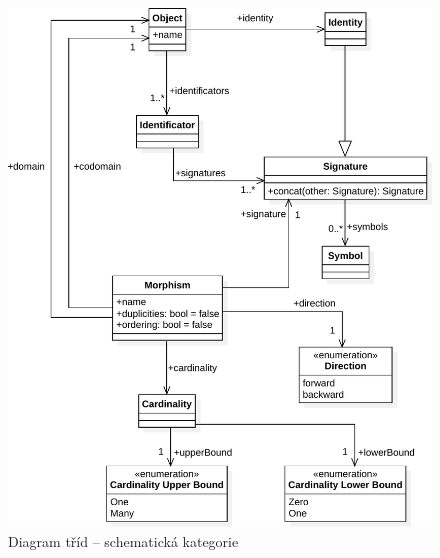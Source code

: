 \begin{figure}[!htb]
  \centering
  \includegraphics[width=\maxwidth{\textwidth}]{../img/diagrams/schema-category-model.pdf}
  \caption{Diagram tříd -- schematická kategorie}
  \label{fig:class-diagram:schemcat}
\end{figure}
